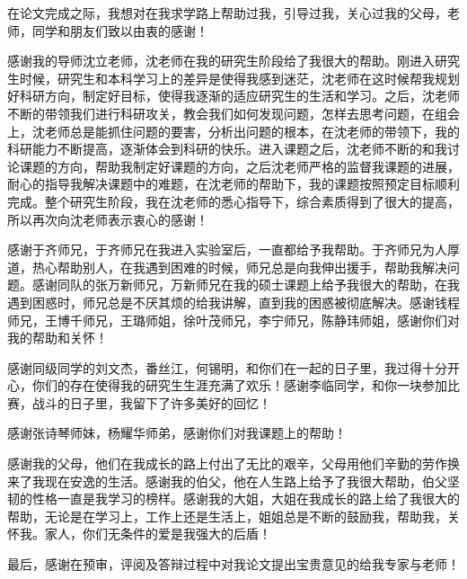 ﻿

\begin{ack}
在论文完成之际，我想对在我求学路上帮助过我，引导过我，关心过我的父母，老师，同学和朋友们致以由衷的感谢！

感谢我的导师沈立老师，沈老师在我的研究生阶段给了我很大的帮助。刚进入研究生时候，研究生和本科学习上的差异是使得我感到迷茫，沈老师在这时候帮我规划好科研方向，制定好目标，使得我逐渐的适应研究生的生活和学习。之后，沈老师不断的带领我们进行科研攻关，教会我们如何发现问题，怎样去思考问题，在组会上，沈老师总是能抓住问题的要害，分析出问题的根本，在沈老师的带领下，我的科研能力不断提高，逐渐体会到科研的快乐。进入课题之后，沈老师不断的和我讨论课题的方向，帮助我制定好课题的方向，之后沈老师严格的监督我课题的进展，耐心的指导我解决课题中的难题，在沈老师的帮助下，我的课题按照预定目标顺利完成。整个研究生阶段，我在沈老师的悉心指导下，综合素质得到了很大的提高，所以再次向沈老师表示衷心的感谢！

感谢于齐师兄，于齐师兄在我进入实验室后，一直都给予我帮助。于齐师兄为人厚道，热心帮助别人，在我遇到困难的时候，师兄总是向我伸出援手，帮助我解决问题。感谢同队的张万新师兄，万新师兄在我的硕士课题上给予我很大的帮助，在我遇到困惑时，师兄总是不厌其烦的给我讲解，直到我的困惑被彻底解决。感谢钱程师兄，王博千师兄，王璐师姐，徐叶茂师兄，李宁师兄，陈静玮师姐，感谢你们对我的帮助和关怀！

感谢同级同学的刘文杰，番丝江，何锡明，和你们在一起的日子里，我过得十分开心，你们的存在使得我的研究生生涯充满了欢乐！感谢李临同学，和你一块参加比赛，战斗的日子里，我留下了许多美好的回忆！

感谢张诗琴师妹，杨耀华师弟，感谢你们对我课题上的帮助！

感谢我的父母，他们在我成长的路上付出了无比的艰辛，父母用他们辛勤的劳作换来了我现在安逸的生活。感谢我的伯父，他在人生路上给予了我很大帮助，伯父坚韧的性格一直是我学习的榜样。感谢我的大姐，大姐在我成长的路上给了我很大的帮助，无论是在学习上，工作上还是生活上，姐姐总是不断的鼓励我，帮助我，关怀我。家人，你们无条件的爱是我强大的后盾！

最后，感谢在预审，评阅及答辩过程中对我论文提出宝贵意见的给我专家与老师！
\end{ack}
